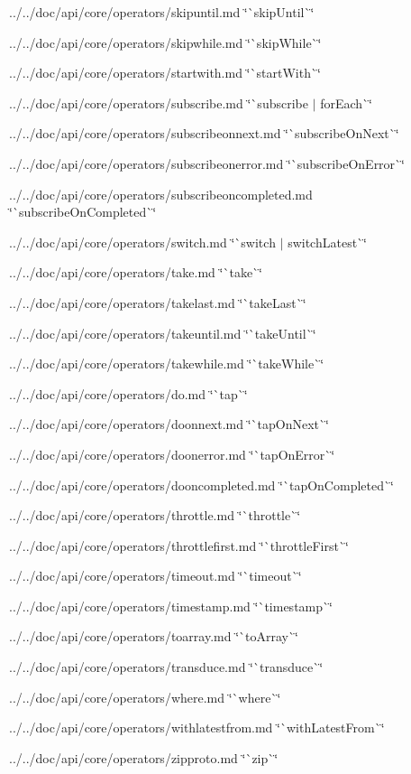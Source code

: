 \begin{DoxyItemize}
\item ../../doc/api/core/operators/skipuntil.md \char`\"{}\`{}skip\+Until\`{}\char`\"{}
\item ../../doc/api/core/operators/skipwhile.md \char`\"{}\`{}skip\+While\`{}\char`\"{}
\item ../../doc/api/core/operators/startwith.md \char`\"{}\`{}start\+With\`{}\char`\"{}
\item ../../doc/api/core/operators/subscribe.md \char`\"{}\`{}subscribe $\vert$ for\+Each\`{}\char`\"{}
\item ../../doc/api/core/operators/subscribeonnext.md \char`\"{}\`{}subscribe\+On\+Next\`{}\char`\"{}
\item ../../doc/api/core/operators/subscribeonerror.md \char`\"{}\`{}subscribe\+On\+Error\`{}\char`\"{}
\item ../../doc/api/core/operators/subscribeoncompleted.md \char`\"{}\`{}subscribe\+On\+Completed\`{}\char`\"{}
\item ../../doc/api/core/operators/switch.md \char`\"{}\`{}switch $\vert$ switch\+Latest\`{}\char`\"{}
\item ../../doc/api/core/operators/take.md \char`\"{}\`{}take\`{}\char`\"{}
\item ../../doc/api/core/operators/takelast.md \char`\"{}\`{}take\+Last\`{}\char`\"{}
\item ../../doc/api/core/operators/takeuntil.md \char`\"{}\`{}take\+Until\`{}\char`\"{}
\item ../../doc/api/core/operators/takewhile.md \char`\"{}\`{}take\+While\`{}\char`\"{}
\item ../../doc/api/core/operators/do.md \char`\"{}\`{}tap\`{}\char`\"{}
\item ../../doc/api/core/operators/doonnext.md \char`\"{}\`{}tap\+On\+Next\`{}\char`\"{}
\item ../../doc/api/core/operators/doonerror.md \char`\"{}\`{}tap\+On\+Error\`{}\char`\"{}
\item ../../doc/api/core/operators/dooncompleted.md \char`\"{}\`{}tap\+On\+Completed\`{}\char`\"{}
\item ../../doc/api/core/operators/throttle.md \char`\"{}\`{}throttle\`{}\char`\"{}
\item ../../doc/api/core/operators/throttlefirst.md \char`\"{}\`{}throttle\+First\`{}\char`\"{}
\item ../../doc/api/core/operators/timeout.md \char`\"{}\`{}timeout\`{}\char`\"{}
\item ../../doc/api/core/operators/timestamp.md \char`\"{}\`{}timestamp\`{}\char`\"{}
\item ../../doc/api/core/operators/toarray.md \char`\"{}\`{}to\+Array\`{}\char`\"{}
\item ../../doc/api/core/operators/transduce.md \char`\"{}\`{}transduce\`{}\char`\"{}
\item ../../doc/api/core/operators/where.md \char`\"{}\`{}where\`{}\char`\"{}
\item ../../doc/api/core/operators/withlatestfrom.md \char`\"{}\`{}with\+Latest\+From\`{}\char`\"{}
\item ../../doc/api/core/operators/zipproto.md \char`\"{}\`{}zip\`{}\char`\"{}
\end{DoxyItemize}

